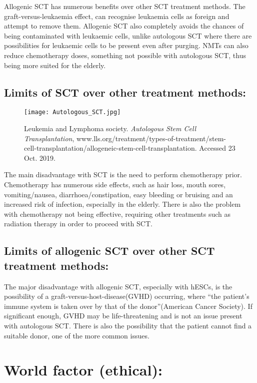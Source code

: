 \documentclass[11pt, a4]{article}
\begin{document}
				Allogenic SCT has numerous benefits over other SCT treatment methods. The graft-versus-leukaemia effect, can recognise leukaemia cells as foreign and attempt to remove them. Allogenic SCT also completely avoids the chances of being contaminated with leukaemic cells, unlike autologous SCT where there are possibilities for leukaemic cells to be present even after purging. NMTs can also reduce chemotherapy doses, something not possible with autologous SCT, thus being more suited for the elderly.
				
			\subsection{Limits of SCT over other treatment methods:}
			\begin{wrapfigure}{r}{4 cm}
				\centering
				\texttt{[image: Autologous\_SCT.jpg]}
				\caption{\footnotesize Leukemia and Lymphoma society. \textit{Autologous Stem Cell Transplantation}, www.lls.org/treatment/types-of-treatment/stem-cell-transplantation/allogeneic-stem-cell-transplantation. Accessed 23 Oct. 2019.}
				\vspace{-70pt}
			\end{wrapfigure}	
			
				The main disadvantage with SCT is the need to perform chemotherapy prior. Chemotherapy has numerous side effects, such as hair loss, mouth sores, vomiting/nausea, diarrhoea/constipation, easy bleeding or bruising and an increased risk of infection, especially in the elderly. There is also the problem with chemotherapy not being effective, requiring other treatments such as radiation therapy in order to proceed with SCT.
				
			\subsection{Limits of allogenic SCT over other SCT treatment methods:}
				The major disadvantage with allogenic SCT, especially with hESCs, is the possibility of a graft-versus-host-disease(GVHD) occurring, where ``the patient’s immune system is taken over by that of the donor''(American Cancer Society). If significant enough, GVHD may be life-threatening and is not an issue present with autologous SCT. There is also the possibility that the patient cannot find a suitable donor, one of the more common issues.
				
	\section{World factor (ethical):}
	
\end{document}
